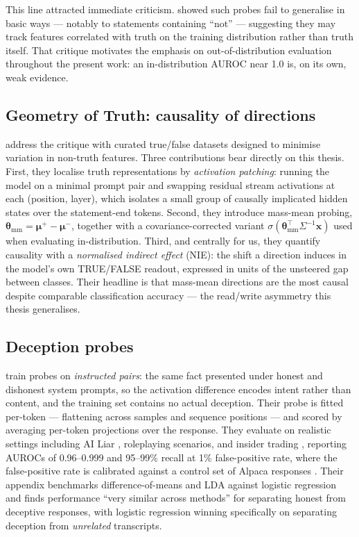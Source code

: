 \documentclass[conference]{IEEEtran}
\begin{document}
This line attracted immediate criticism. \citet{levinstein2024} showed such
probes fail to generalise in basic ways --- notably to statements containing
``not'' --- suggesting they may track features correlated with truth on the
training distribution rather than truth itself. That critique motivates the
emphasis on out-of-distribution evaluation throughout the present work: an
in-distribution AUROC near 1.0 is, on its own, weak evidence.

\subsection{Geometry of Truth: causality of directions}

\citet{marks2024} address the critique with curated true/false datasets designed
to minimise variation in non-truth features. Three contributions bear directly
on this thesis. First, they localise truth representations by \emph{activation
patching}: running the model on a minimal prompt pair and swapping residual
stream activations at each (position, layer), which isolates a small group of
causally implicated hidden states over the statement-end tokens. Second, they
introduce mass-mean probing, $\boldsymbol{\theta}_{\mathrm{mm}} =
\boldsymbol{\mu}^{+} - \boldsymbol{\mu}^{-}$, together with a
covariance-corrected variant $\sigma(\boldsymbol{\theta}_{\mathrm{mm}}^{\top}
\Sigma^{-1} \mathbf{x})$ used when evaluating in-distribution. Third, and
centrally for us, they quantify causality with a \emph{normalised indirect
effect} (NIE): the shift a direction induces in the model's own TRUE/FALSE
readout, expressed in units of the unsteered gap between classes. Their
headline is that mass-mean directions are the most causal despite comparable
classification accuracy --- the read/write asymmetry this thesis generalises.

\subsection{Deception probes}

\citet{goldowsky2025} train probes on \emph{instructed pairs}: the same fact
presented under honest and dishonest system prompts, so the activation
difference encodes intent rather than content, and the training set contains no
actual deception. Their probe is fitted per-token --- flattening across samples
and sequence positions --- and scored by averaging per-token projections over
the response. They evaluate on realistic settings including AI Liar
\citep{pacchiardi2024}, roleplaying scenarios, and insider trading
\citep{scheurer2023}, reporting AUROCs of 0.96--0.999 and 95--99\% recall at 1\%
false-positive rate, where the false-positive rate is calibrated against a
control set of Alpaca responses \citep{taori2023}. Their appendix benchmarks
difference-of-means and LDA against logistic regression and finds performance
``very similar across methods'' for separating honest from deceptive responses,
with logistic regression winning specifically on separating deception from
\emph{unrelated} transcripts.
\end{document}
